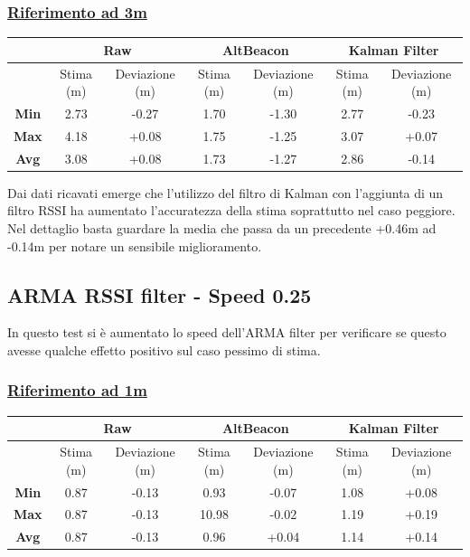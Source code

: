 \subsubsection{\underline{Riferimento ad 3m}}
\begin{center}
	\begin{tabular}{|c|c|c|c|c|c|c|}
		\hline 
		& \multicolumn{2}{|c|}{\textbf{Raw}} &\multicolumn{2}{|c|}{\textbf{AltBeacon}} &\multicolumn{2}{|c|}{\textbf{Kalman Filter}}\\ 
		\hline 
		& Stima (m) & Deviazione (m) & Stima (m) & Deviazione (m) & Stima (m)& Deviazione (m)\\ 
		\hline 
		\textbf{Min} & 2.73	& -0.27 & 1.70	& -1.30 & 2.77	& -0.23 \\ 
		\hline 
		\textbf{Max} & 4.18	& +0.08 & 1.75	& -1.25 & 3.07	& +0.07	\\ 
		\hline 
		\textbf{Avg} & 3.08	& +0.08 & 1.73 	& -1.27 & 2.86 	& -0.14	\\ 
		\hline 
	\end{tabular}
\end{center}

Dai dati ricavati emerge che l'utilizzo del filtro di Kalman con l'aggiunta di un filtro RSSI ha aumentato l'accuratezza della stima soprattutto nel caso peggiore. Nel dettaglio basta guardare la media che passa da un precedente +0.46m ad -0.14m per notare un sensibile miglioramento.

\newpage
\subsection{ARMA RSSI filter - Speed 0.25}

In questo test si è aumentato lo speed dell'ARMA filter per verificare se questo avesse qualche effetto positivo sul caso pessimo di stima.

\subsubsection{\underline{Riferimento ad 1m}}
\begin{center}
	\begin{tabular}{|c|c|c|c|c|c|c|}
		\hline 
		& \multicolumn{2}{|c|}{\textbf{Raw}} &\multicolumn{2}{|c|}{\textbf{AltBeacon}} &\multicolumn{2}{|c|}{\textbf{Kalman Filter}}\\ 
		\hline 
		& Stima (m) & Deviazione (m) & Stima (m) & Deviazione (m) & Stima (m)& Deviazione (m)\\ 
		\hline 
		\textbf{Min} & 0.87	& -0.13 & 0.93	& -0.07 & 1.08	& +0.08 \\ 
		\hline 
		\textbf{Max} & 0.87	& -0.13 & 10.98	& -0.02 & 1.19	& +0.19	\\ 
		\hline 
		\textbf{Avg} & 0.87 & -0.13 & 0.96 	& +0.04 & 1.14 	& +0.14	\\ 
		\hline 
	\end{tabular}
\end{center}

